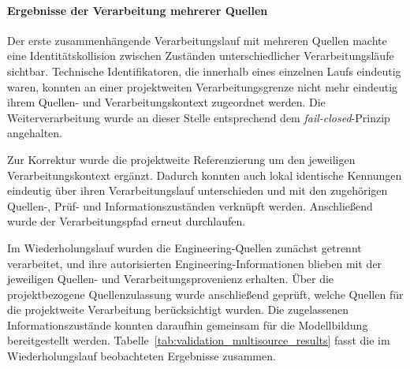 \paragraph{Ergebnisse der Verarbeitung mehrerer Quellen}

Der erste zusammenhängende Verarbeitungslauf mit mehreren Quellen machte
eine Identitätskollision zwischen Zuständen unterschiedlicher
Verarbeitungsläufe sichtbar. Technische Identifikatoren, die innerhalb eines
einzelnen Laufs eindeutig waren, konnten an einer projektweiten
Verarbeitungsgrenze nicht mehr eindeutig ihrem Quellen- und
Verarbeitungskontext zugeordnet werden. Die Weiterverarbeitung wurde an
dieser Stelle entsprechend dem \emph{fail-closed}-Prinzip angehalten.

Zur Korrektur wurde die projektweite Referenzierung um den jeweiligen
Verarbeitungskontext ergänzt. Dadurch konnten auch lokal identische
Kennungen eindeutig über ihren Verarbeitungslauf unterschieden und mit den
zugehörigen Quellen-, Prüf- und Informationszuständen verknüpft werden.
Anschließend wurde der Verarbeitungspfad erneut durchlaufen.

Im Wiederholungslauf wurden die Engineering-Quellen zunächst getrennt
verarbeitet, und ihre autorisierten Engineering-Informationen blieben mit
der jeweiligen Quellen- und Verarbeitungsprovenienz erhalten. Über die
projektbezogene Quellenzulassung wurde anschließend geprüft, welche Quellen
für die projektweite Verarbeitung berücksichtigt wurden. Die zugelassenen
Informationszustände konnten daraufhin gemeinsam für die Modellbildung
bereitgestellt werden.
\noindent
Tabelle~\ref{tab:validation_multisource_results} fasst die im
Wiederholungslauf beobachteten Ergebnisse zusammen.

